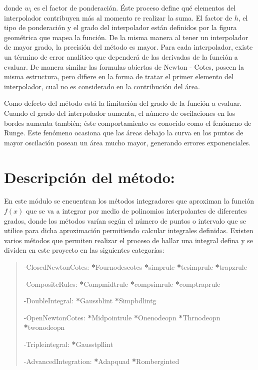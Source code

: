\documentclass[letterpaper,10pt,oneside]{sphinxmanual}
\theoremstyle{plain}%
\theoremstyle{definition}%
\theoremstyle{remark}%
\begin{document}
donde $w_{i}$ es el factor de ponderación. Éste proceso define qué elementos del interpolador contribuyen más al momento re realizar la suma. El factor de $h$, el tipo de ponderación y el grado del interpolador están definidos por la figura geométrica que mapea la función. De la misma manera al tener un interpolador de mayor grado, la precisión del método es mayor. Para cada interpolador, existe un término de error analítico que dependerá de las derivadas de la función a evaluar. De manera similar las formulas abiertas de Newton - Cotes, poseen la misma estructura, pero difiere en la forma de tratar el primer elemento del interpolador, cual no es considerado en la contribución del área.

Como defecto del método está la limitación del grado de la función a evaluar. Cuando el grado del interpolador aumenta, el número de oscilaciones en los bordes aumenta también; éste comportamiento es conocido como el fenómeno de Runge. Este fenómeno ocasiona que las áreas debajo la curva en los puntos de mayor oscilación posean un área mucho mayor, generando errores exponenciales.


\section{Descripción del método:}
\label{chapter05:descripcion-del-metodo}
En este módulo se encuentran los métodos integradores que aproximan la función $f(x)$ que se va a integrar por medio de polinomios interpolantes de diferentes grados, donde los métodos varían según el número de puntos o intervalo que se utilice para dicha aproximación permitiendo calcular integrales definidas. Existen varios métodos que permiten realizar el proceso de hallar una integral defina y se dividen en este proyecto en las siguientes categorías:
\begin{quote}

\begin{optionlist}{3cm}
\item [-ClosedNewtonCotes:]  
{\color{red}\bfseries{}*}Fournodescotes
{\color{red}\bfseries{}*}simprule
{\color{red}\bfseries{}*}tesimprule
{\color{red}\bfseries{}*}trapzrule
\item [-CompositeRules:]  
{\color{red}\bfseries{}*}Compmidtrule
{\color{red}\bfseries{}*}compsimrule
{\color{red}\bfseries{}*}comptraprule
\item [-DoubleIntegral:]  
{\color{red}\bfseries{}*}Gaussblint
{\color{red}\bfseries{}*}Simpbdlintg
\item [-OpenNewtonCotes:]  
{\color{red}\bfseries{}*}Midpointrule
{\color{red}\bfseries{}*}Onenodeopn
{\color{red}\bfseries{}*}Thrnodeopn
{\color{red}\bfseries{}*}twonodeopn
\item [-Tripleintegral:]  
{\color{red}\bfseries{}*}Gausstpllint
\item [-AdvancedIntegration:]  
{\color{red}\bfseries{}*}Adapquad
{\color{red}\bfseries{}*}Romberginted
\end{optionlist}
\end{quote}
\end{document}

